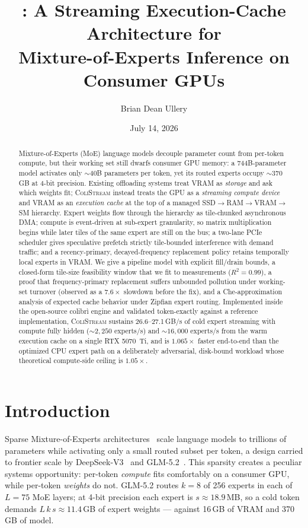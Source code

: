 \documentclass[11pt]{article}
\title{\colistream: A Streaming Execution-Cache Architecture for\\
Mixture-of-Experts Inference on Consumer GPUs}
\author{Brian Dean Ullery}
\date{July 14, 2026}
\theoremstyle{definition}
\theoremstyle{remark}
\newcommand{\colistream}{\textsc{ColiStream}}
\begin{document}
\maketitle

\begin{abstract}
Mixture-of-Experts (MoE) language models decouple parameter count from
per-token compute, but their working set still dwarfs consumer GPU memory: a
744B-parameter model activates only ${\sim}40$B parameters per token, yet its
routed experts occupy ${\sim}370$\,GB at 4-bit precision. Existing offloading
systems treat VRAM as \emph{storage} and ask which weights fit; \colistream{}
instead treats the GPU as a \emph{streaming compute device} and VRAM as an
\emph{execution cache} at the top of a managed
SSD$\to$RAM$\to$VRAM$\to$SM hierarchy. Expert weights flow through the
hierarchy as tile-chunked asynchronous DMA; compute is event-driven at
sub-expert granularity, so matrix multiplication begins while later tiles of
the same expert are still on the bus; a two-lane PCIe scheduler gives
speculative prefetch strictly tile-bounded interference with demand traffic;
and a recency-primary, decayed-frequency replacement policy retains
temporally local experts in VRAM. We give a pipeline model with explicit
fill/drain bounds, a closed-form tile-size feasibility window that we fit to
measurements ($R^2{=}0.99$), a proof that frequency-primary replacement
suffers unbounded pollution under working-set turnover (observed as a
$7.6\times$ slowdown before the fix), and a Che-approximation analysis of
expected cache behavior under Zipfian expert routing. Implemented inside the
open-source colibr\`i engine and validated token-exactly against a reference
implementation, \colistream{} sustains 26.6--27.1\,GB/s of cold expert
streaming with compute fully hidden (${\sim}2{,}250$ experts/s) and
${\sim}16{,}000$ experts/s from the warm execution cache on a single RTX
5070~Ti, and is $1.065\times$ faster end-to-end than the optimized CPU expert
path on a deliberately adversarial, disk-bound workload whose theoretical
compute-side ceiling is $1.05\times$.
\end{abstract}

\section{Introduction}

Sparse Mixture-of-Experts architectures~\citep{shazeer2017outrageously,
lepikhin2020gshard,fedus2022switch} scale language models to trillions of
parameters while activating only a small routed subset per token, a design
carried to frontier scale by DeepSeek-V3~\citep{deepseek2024v3} and
GLM-5.2~\citep{glm52report}. This sparsity creates a peculiar systems
opportunity: per-token \emph{compute} fits comfortably on a consumer GPU,
while per-token \emph{weights} do not. GLM-5.2 routes $k{=}8$ of 256 experts
in each of $L{=}75$ MoE layers; at 4-bit precision each expert is
$s\approx18.9$\,MB, so a cold token demands $L\,k\,s\approx11.4$\,GB of expert
weights --- against 16\,GB of VRAM and 370\,GB of model.
\end{document}

